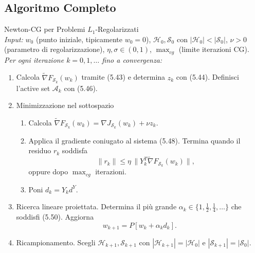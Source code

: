\documentclass[italian, a4paper, twoside, binding=6mm]{sapthesis}
\begin{document}
\newpage

\subsection{Algoritmo Completo}

\begin{actionbox}
  Newton-CG per Problemi $L_1$-Regolarizzati\\[0.3cm]
  \textit{Input:} $w_0$ (punto iniziale, tipicamente $w_0=0$),
  $\mathcal{H}_0, \mathcal{S}_0$ con $|\mathcal{H}_0| < |\mathcal{S}_0|$,
  $\nu > 0$ (parametro di regolarizzazione),
  $\eta, \sigma \in (0,1)$,
  $\operatorname{max}_{cg}$ (limite iterazioni CG).\\[0.1cm]
  
  \textit{Per ogni iterazione $k = 0, 1, \dots$ fino a convergenza:}
  \begin{enumerate}
    \item
    Calcola $\widetilde{\nabla}F_{\mathcal{S}_k}(w_k)$ tramite (5.43) e
    determina $z_k$ con (5.44). Definisci l'active set $\mathcal{A}_k$ con (5.46).
    
    \item Minimizzazione nel sottospazio
    \begin{enumerate}
      \item Calcola $\widetilde{\nabla}F_{\mathcal{S}_k}(w_k) = \nabla J_{\mathcal{S}_k}(w_k) + \nu z_k$.
      \item Applica il gradiente coniugato al sistema (5.48). Termina quando
      il residuo $r_k$ soddisfa
      \[
      \|r_k\| \le \eta \, \|Y_k^T \widetilde{\nabla}F_{\mathcal{S}_k}(w_k)\|, \tag{5.51}\label{eq:cg_l1}
      \]
      oppure dopo $\operatorname{max}_{cg}$ iterazioni.
      \item Poni $d_k = Y_k d^Y$.
    \end{enumerate}
    
    \item Ricerca lineare proiettata.
    Determina il più grande $\alpha_k \in \{1, \frac{1}{2}, \frac{1}{4}, \dots\}$
    che soddisfi (5.50). Aggiorna
    \[
    w_{k+1} = P[w_k + \alpha_k d_k].
    \]
    
    \item Ricampionamento.
    Scegli $\mathcal{H}_{k+1}, \mathcal{S}_{k+1}$ con
    $|\mathcal{H}_{k+1}| = |\mathcal{H}_0|$ e
    $|\mathcal{S}_{k+1}| = |\mathcal{S}_0|$.
  \end{enumerate}
\end{actionbox}
\end{document}
